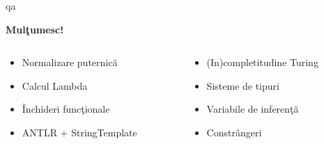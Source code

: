 \documentclass[]{prezentare}
\begin{document}
    \begin{frame}

    \begin{beamercolorbox}[rounded=true,shadow=true]{qa}
    \begin{center}
        {\Huge \textbf{Mul\c tumesc!}}
    \end{center}
    \end{beamercolorbox}
    \vfill
    \begin{columns}
            \begin{column}[l]{0.5\textwidth}
                \begin{itemize}
                    \item Normalizare puternic\u a
                    \item Calcul Lambda
                    \item \^ Inchideri func\c tionale
                    \item ANTLR + StringTemplate
                \end{itemize}
            \end{column}
            \begin{column}[l]{0.5\textwidth}
                \begin{itemize}
                    \item (In)completitudine Turing
                    \item Sisteme de tipuri
                    \item Variabile de inferen\c t\u a
                    \item Constr\^ angeri
                \end{itemize}
            \end{column}
    \end{columns}
    \end{frame}
\end{document}
